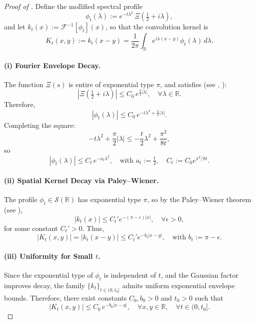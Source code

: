 \begin{proof}[Proof of ]
Define the mollified spectral profile
\[
\phi_t(\lambda) := e^{-t\lambda^2} \, \Xi\left(\tfrac{1}{2} + i\lambda\right),
\]
and let \( k_t(x) := \mathscr{F}^{-1}[\phi_t](x) \), so that the convolution kernel is
\[
K_t(x,y) := k_t(x - y) = \frac{1}{2\pi} \int_{\mathbb{R}} e^{i\lambda(x - y)} \phi_t(\lambda)\, d\lambda.
\]

\paragraph{(i) Fourier Envelope Decay.}
The function \( \Xi(s) \) is entire of exponential type \( \pi \), and satisfies (see \cite[Thm.~3.7.1]{Levin1996EntireLectures}, \cite[§4.12]{Titchmarsh1986Zeta}):
\[
\left| \Xi\left( \tfrac{1}{2} + i\lambda \right) \right| \le C_0\, e^{\frac{\pi}{2} |\lambda|}, \quad \forall \lambda \in \mathbb{R}.
\]
Therefore,
\[
|\phi_t(\lambda)| \le C_0\, e^{-t\lambda^2 + \frac{\pi}{2}|\lambda|}.
\]
Completing the square:
\[
-t\lambda^2 + \frac{\pi}{2}|\lambda| \le -\frac{t}{2} \lambda^2 + \frac{\pi^2}{8t},
\]
so
\[
|\phi_t(\lambda)| \le C_t\, e^{-a_t \lambda^2}, \quad \text{with } a_t := \tfrac{t}{2}, \quad C_t := C_0 e^{\pi^2/8t}.
\]

\paragraph{(ii) Spatial Kernel Decay via Paley–Wiener.}
The profile \( \phi_t \in \mathcal{S}(\mathbb{R}) \) has exponential type \( \pi \), so by the Paley–Wiener theorem (see \cite[Ch.~IX.4]{ReedSimon1975II}),
\[
|k_t(x)| \le C_t' e^{-(\pi - \epsilon)|x|}, \quad \forall \epsilon > 0,
\]
for some constant \( C_t' > 0 \). Thus,
\[
|K_t(x,y)| = |k_t(x - y)| \le C_t' e^{-b_t |x - y|}, \quad \text{with } b_t := \pi - \epsilon.
\]

\paragraph{(iii) Uniformity for Small \( t \).}
Since the exponential type of \( \phi_t \) is independent of \( t \), and the Gaussian factor improves decay, the family \( \{k_t\}_{t \in (0, t_0]} \) admits uniform exponential envelope bounds. Therefore, there exist constants \( C_0, b_0 > 0 \) and \( t_0 > 0 \) such that
\[
|K_t(x,y)| \le C_0\, e^{-b_0 |x - y|}, \quad \forall x, y \in \mathbb{R}, \quad \forall t \in (0, t_0].
\]


\end{proof}
